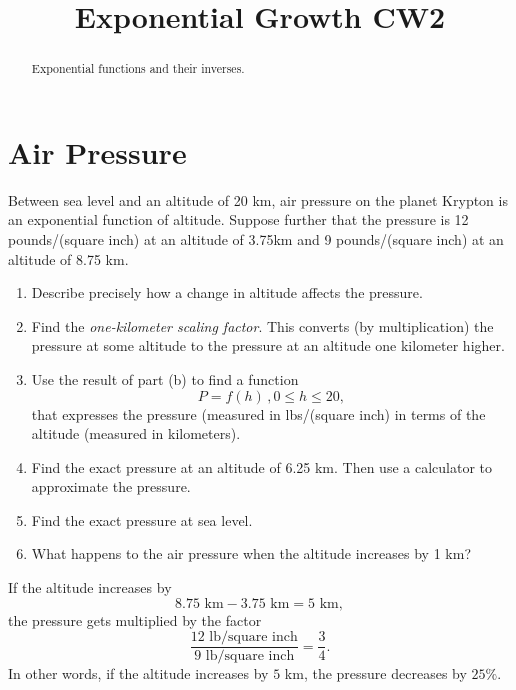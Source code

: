 \documentclass{ximera}
\title{Exponential Growth CW2}
\begin{document}
\begin{abstract}
Exponential functions and their inverses.
\end{abstract}
\maketitle


\section{Air Pressure}


\begin{question} \label{Qewr3b3e}

Between sea level and an altitude of 20 km,  air pressure on the planet Krypton is an exponential function of altitude. Suppose further that the pressure is 12 pounds/(square inch) at an altitude of 3.75km and 9 pounds/(square inch) at an altitude of  8.75 km.

\begin{enumerate}
\item Describe precisely how a change in altitude affects the pressure.

\item Find the \emph{one-kilometer scaling factor}. This converts (by multiplication) the pressure at some altitude to the pressure at an altitude one kilometer higher.

\item Use the result of part (b) to find a function
\[
    P = f(h) \, , 0\leq h \leq 20,
\]
that expresses the pressure (measured in lbs/(square inch) in terms of the altitude (measured in kilometers). 

\item Find the exact pressure at an altitude of 6.25 km. Then use a calculator to approximate the pressure.

\item Find the exact pressure at sea level.

\item What happens to the air pressure when the altitude increases by 1 km?
\end{enumerate}

\begin{explanation}
\item If the altitude increases by 
\[
    8.75\text{ km} - 3.75\text{ km} = 5 \text{ km},
\]
the pressure gets multiplied by the factor
\[
  \frac{12 \text{ lb/square inch}}{9 \text{ lb/square inch}} = \frac{3}{4}.
\]
In other words, if the altitude increases by $5$ km, the pressure decreases by $25\%$.


\end{explanation}
\end{question}
\end{document}
